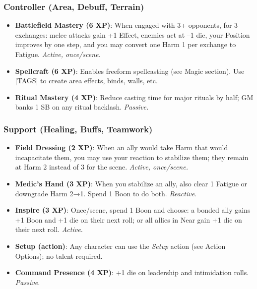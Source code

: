 \subsubsection*{Controller (Area, Debuff, Terrain)}
\begin{itemize}
  \item \textbf{Battlefield Mastery (6 XP)}: When engaged with 3+ opponents, for 3 exchanges: melee attacks gain +1 Effect, enemies act at –1 die, your Position improves by one step, and you may convert one Harm 1 per exchange to Fatigue. \textit{Active, once/scene.}
  \item \textbf{Spellcraft (6 XP)}: Enables freeform spellcasting (see Magic section). Use [TAGS] to create area effects, binds, walls, etc.
  \item \textbf{Ritual Mastery (4 XP)}: Reduce casting time for major rituals by half; GM banks 1 SB on any ritual backlash. \textit{Passive.}
\end{itemize}

\subsubsection*{Support (Healing, Buffs, Teamwork)}
\begin{itemize}
  \item \textbf{Field Dressing (2 XP)}: When an ally would take Harm that would incapacitate them, you may use your reaction to stabilize them; they remain at Harm 2 instead of 3 for the scene. \textit{Active, once/scene.}
  \item \textbf{Medic's Hand (3 XP)}: When you stabilize an ally, also clear 1 Fatigue or downgrade Harm 2→1. Spend 1 Boon to do both. \textit{Reactive.}
  \item \textbf{Inspire (3 XP)}: Once/scene, spend 1 Boon and choose: a bonded ally gains +1 Boon and +1 die on their next roll; or all allies in Near gain +1 die on their next roll. \textit{Active.}
  \item \textbf{Setup (action)}: Any character can use the \textit{Setup} action (see Action Options); no talent required.
  \item \textbf{Command Presence (4 XP)}: +1 die on leadership and intimidation rolls. \textit{Passive.}
\end{itemize}

